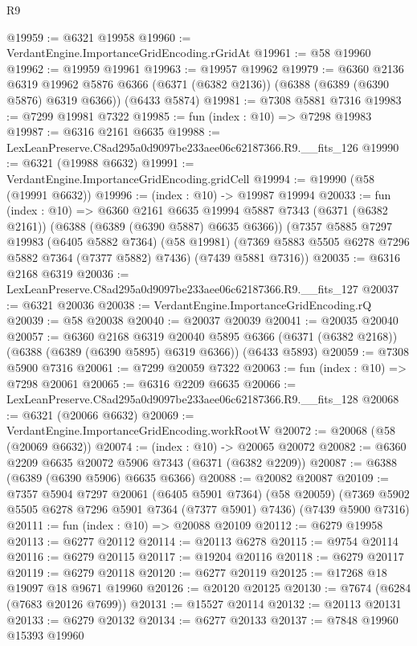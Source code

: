 \begin{lexlean}{R9}
\begin{coremodule}
@19959 := @6321 @19958
@19960 := VerdantEngine.ImportanceGridEncoding.rGridAt
@19961 := @58 @19960
@19962 := @19959 @19961
@19963 := @19957 @19962
@19979 := @6360
    @2136
    @6319
    @19962
    @5876
    @6366
    (@6371 (@6382 @2136))
    (@6388 (@6389 (@6390 @5876) @6319 @6366))
    (@6433 @5874)
@19981 := @7308 @5881 @7316
@19983 := @7299 @19981 @7322
@19985 := fun (index : @10) => @7298 @19983
@19987 := @6316 @2161 @6635
@19988 := LexLeanPreserve.C8ad295a0d9097be233aee06c62187366.R9.__fits_126
@19990 := @6321 (@19988 @6632)
@19991 := VerdantEngine.ImportanceGridEncoding.gridCell
@19994 := @19990 (@58 (@19991 @6632))
@19996 := (index : @10) -> @19987 @19994
@20033 := fun (index : @10) =>
  @6360
    @2161
    @6635
    @19994
    @5887
    @7343
    (@6371 (@6382 @2161))
    (@6388 (@6389 (@6390 @5887) @6635 @6366))
    (@7357
      @5885
      @7297
      @19983
      (@6405 @5882 @7364)
      (@58 @19981)
      (@7369 @5883 @5505 @6278 @7296 @5882 @7364 (@7377 @5882) @7436)
      (@7439 @5881 @7316))
@20035 := @6316 @2168 @6319
@20036 := LexLeanPreserve.C8ad295a0d9097be233aee06c62187366.R9.__fits_127
@20037 := @6321 @20036
@20038 := VerdantEngine.ImportanceGridEncoding.rQ
@20039 := @58 @20038
@20040 := @20037 @20039
@20041 := @20035 @20040
@20057 := @6360
    @2168
    @6319
    @20040
    @5895
    @6366
    (@6371 (@6382 @2168))
    (@6388 (@6389 (@6390 @5895) @6319 @6366))
    (@6433 @5893)
@20059 := @7308 @5900 @7316
@20061 := @7299 @20059 @7322
@20063 := fun (index : @10) => @7298 @20061
@20065 := @6316 @2209 @6635
@20066 := LexLeanPreserve.C8ad295a0d9097be233aee06c62187366.R9.__fits_128
@20068 := @6321 (@20066 @6632)
@20069 := VerdantEngine.ImportanceGridEncoding.workRootW
@20072 := @20068 (@58 (@20069 @6632))
@20074 := (index : @10) -> @20065 @20072
@20082 := @6360 @2209 @6635 @20072 @5906 @7343 (@6371 (@6382 @2209))
@20087 := @6388 (@6389 (@6390 @5906) @6635 @6366)
@20088 := @20082 @20087
@20109 := @7357
    @5904
    @7297
    @20061
    (@6405 @5901 @7364)
    (@58 @20059)
    (@7369 @5902 @5505 @6278 @7296 @5901 @7364 (@7377 @5901) @7436)
    (@7439 @5900 @7316)
@20111 := fun (index : @10) => @20088 @20109
@20112 := @6279 @19958
@20113 := @6277 @20112
@20114 := @20113 @6278
@20115 := @9754 @20114
@20116 := @6279 @20115
@20117 := @19204 @20116
@20118 := @6279 @20117
@20119 := @6279 @20118
@20120 := @6277 @20119
@20125 := @17268 @18 @19097 @18 @9671 @19960
@20126 := @20120 @20125
@20130 := @7674 (@6284 (@7683 @20126 @7699))
@20131 := @15527 @20114
@20132 := @20113 @20131
@20133 := @6279 @20132
@20134 := @6277 @20133
@20137 := @7848 @19960 @15393 @19960

\end{coremodule}
\end{lexlean}
